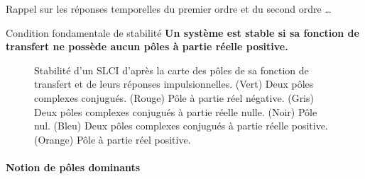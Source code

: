 Rappel sur les réponses temporelles du premier ordre et du second ordre \ldots
\acpl
\begin{criteria}{Condition fondamentale de stabilité}
    \textbf{Un système est stable si sa fonction de transfert ne possède aucun 
            pôles à partie réelle positive.}
\end{criteria}
\clearpage
\thispagestyle{empty}
\begin{landscape}
\centering
\captionsetup{width=1.15\linewidth}
\begin{figure}[!h]
    \centering
    
    \caption{Stabilité d'un SLCI d'après la carte des pôles de sa fonction de
             transfert et de leurs réponses impulsionnelles. 
             (Vert) Deux pôles complexes conjugués. 
             (Rouge) Pôle à partie réel négative. 
             (Gris) Deux pôles complexes conjugués à partie réelle nulle.
             (Noir) Pôle nul.
             (Bleu) Deux pôles complexes conjugués à partie réelle positive.
             (Orange) Pôle à partie réel positive.}
\end{figure}
\end{landscape}
\clearpage
\pagestyle{fancy}
\captionsetup{width=\linewidth}
\paragraph{Notion de pôles dominants}
